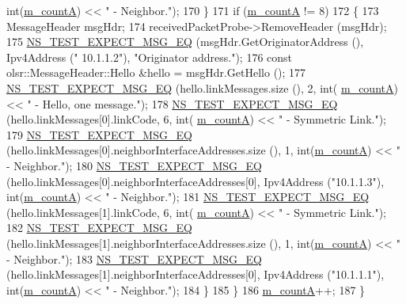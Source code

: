 \begin{DoxyCode}
{      int}(\hyperlink{classns3_1_1olsr_1_1TcRegressionTest_ad4df9f9a1950da47355d1623fb2a57ed}{m\_countA}) << \textcolor{stringliteral}{" - Neighbor."});
170         \}
171       \textcolor{keywordflow}{if} (\hyperlink{classns3_1_1olsr_1_1TcRegressionTest_ad4df9f9a1950da47355d1623fb2a57ed}{m\_countA} != 8)
172         \{
173           MessageHeader msgHdr;
174           receivedPacketProbe->RemoveHeader (msgHdr);
175           \hyperlink{group__testing_ga7304ba46a28d8cf08dfdfd6499cf7068}{NS\_TEST\_EXPECT\_MSG\_EQ} (msgHdr.GetOriginatorAddress (), Ipv4Address (\textcolor{stringliteral}{"
      10.1.1.2"}), \textcolor{stringliteral}{"Originator address."});
176           \textcolor{keyword}{const} olsr::MessageHeader::Hello &hello = msgHdr.GetHello ();
177           \hyperlink{group__testing_ga7304ba46a28d8cf08dfdfd6499cf7068}{NS\_TEST\_EXPECT\_MSG\_EQ} (hello.linkMessages.size (), 2, int(
      \hyperlink{classns3_1_1olsr_1_1TcRegressionTest_ad4df9f9a1950da47355d1623fb2a57ed}{m\_countA}) << \textcolor{stringliteral}{" - Hello, one message."});
178           \hyperlink{group__testing_ga7304ba46a28d8cf08dfdfd6499cf7068}{NS\_TEST\_EXPECT\_MSG\_EQ} (hello.linkMessages[0].linkCode, 6, \textcolor{keywordtype}{int}(
      \hyperlink{classns3_1_1olsr_1_1TcRegressionTest_ad4df9f9a1950da47355d1623fb2a57ed}{m\_countA}) << \textcolor{stringliteral}{" - Symmetric Link."});
179           \hyperlink{group__testing_ga7304ba46a28d8cf08dfdfd6499cf7068}{NS\_TEST\_EXPECT\_MSG\_EQ} (hello.linkMessages[0].neighborInterfaceAddresses.size
       (), 1, int(\hyperlink{classns3_1_1olsr_1_1TcRegressionTest_ad4df9f9a1950da47355d1623fb2a57ed}{m\_countA}) << \textcolor{stringliteral}{" - Neighbor."});
180           \hyperlink{group__testing_ga7304ba46a28d8cf08dfdfd6499cf7068}{NS\_TEST\_EXPECT\_MSG\_EQ} (hello.linkMessages[0].neighborInterfaceAddresses[0], 
      Ipv4Address (\textcolor{stringliteral}{"10.1.1.3"}), \textcolor{keywordtype}{int}(\hyperlink{classns3_1_1olsr_1_1TcRegressionTest_ad4df9f9a1950da47355d1623fb2a57ed}{m\_countA}) << \textcolor{stringliteral}{" - Neighbor."});
181           \hyperlink{group__testing_ga7304ba46a28d8cf08dfdfd6499cf7068}{NS\_TEST\_EXPECT\_MSG\_EQ} (hello.linkMessages[1].linkCode, 6, \textcolor{keywordtype}{int}(
      \hyperlink{classns3_1_1olsr_1_1TcRegressionTest_ad4df9f9a1950da47355d1623fb2a57ed}{m\_countA}) << \textcolor{stringliteral}{" - Symmetric Link."});
182           \hyperlink{group__testing_ga7304ba46a28d8cf08dfdfd6499cf7068}{NS\_TEST\_EXPECT\_MSG\_EQ} (hello.linkMessages[1].neighborInterfaceAddresses.size
       (), 1, int(\hyperlink{classns3_1_1olsr_1_1TcRegressionTest_ad4df9f9a1950da47355d1623fb2a57ed}{m\_countA}) << \textcolor{stringliteral}{" - Neighbor."});
183           \hyperlink{group__testing_ga7304ba46a28d8cf08dfdfd6499cf7068}{NS\_TEST\_EXPECT\_MSG\_EQ} (hello.linkMessages[1].neighborInterfaceAddresses[0], 
      Ipv4Address (\textcolor{stringliteral}{"10.1.1.1"}), \textcolor{keywordtype}{int}(\hyperlink{classns3_1_1olsr_1_1TcRegressionTest_ad4df9f9a1950da47355d1623fb2a57ed}{m\_countA}) << \textcolor{stringliteral}{" - Neighbor."});
184         \}
185     \}
186   \hyperlink{classns3_1_1olsr_1_1TcRegressionTest_ad4df9f9a1950da47355d1623fb2a57ed}{m\_countA}++;
187 \}
\end{DoxyCode}


